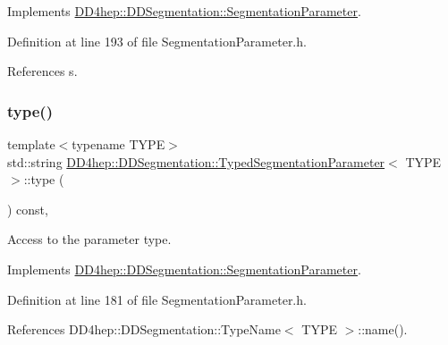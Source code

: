 Implements \hyperlink{class_d_d4hep_1_1_d_d_segmentation_1_1_segmentation_parameter_a91e9dae172660687daec4de4d730b192}{D\+D4hep\+::\+D\+D\+Segmentation\+::\+Segmentation\+Parameter}.



Definition at line 193 of file Segmentation\+Parameter.\+h.



References s.

\hypertarget{class_d_d4hep_1_1_d_d_segmentation_1_1_typed_segmentation_parameter_a94048e5faa76978155f30389ed541bd9}{}\label{class_d_d4hep_1_1_d_d_segmentation_1_1_typed_segmentation_parameter_a94048e5faa76978155f30389ed541bd9} 
\subsubsection{\texorpdfstring{type()}{type()}}
{\footnotesize\ttfamily template$<$typename T\+Y\+PE$>$ \\
std\+::string \hyperlink{class_d_d4hep_1_1_d_d_segmentation_1_1_typed_segmentation_parameter}{D\+D4hep\+::\+D\+D\+Segmentation\+::\+Typed\+Segmentation\+Parameter}$<$ T\+Y\+PE $>$\+::type (\begin{DoxyParamCaption}{ }\end{DoxyParamCaption}) const\hspace{0.3cm}{\ttfamily [inline]}, {\ttfamily [virtual]}}



Access to the parameter type. 



Implements \hyperlink{class_d_d4hep_1_1_d_d_segmentation_1_1_segmentation_parameter_a761f142a3d6d7ecdbc200e97913af165}{D\+D4hep\+::\+D\+D\+Segmentation\+::\+Segmentation\+Parameter}.



Definition at line 181 of file Segmentation\+Parameter.\+h.



References D\+D4hep\+::\+D\+D\+Segmentation\+::\+Type\+Name$<$ T\+Y\+P\+E $>$\+::name().

\hypertarget{class_d_d4hep_1_1_d_d_segmentation_1_1_typed_segmentation_parameter_a2cec07ab827bef9e7b40a8cfc18d9617}{}\label{class_d_d4hep_1_1_d_d_segmentation_1_1_typed_segmentation_parameter_a2cec07ab827bef9e7b40a8cfc18d9617} 

